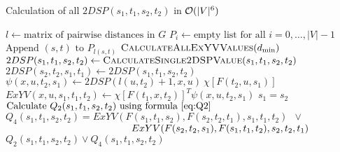 \begin{algorithm}
\caption{Calculation of all $2DSP(s_1, t_1, s_2, t_2)$ in $\mathcal{O}(|V|^6)$}
\begin{algorithmic}[1]
\State $l \gets \text{matrix of pairwise distances in }G$
\State $P_i \gets \text{empty list for all }i = 0, \ldots, |V|-1$
    \State $\text{Append }(s, t)\text{ to }P_{l(s, t)}$
\EndFor
{}
    \State $\textsc{CalculateAllExYVValues}(d_{\min})$
                \State $2DSP(s_1, t_1, s_2, t_2) \gets \textsc{CalculateSingle2DSPValue}(s_1, t_1, s_2, t_2)$
                \State $2DSP(s_2, t_2, s_1, t_1) \gets 2DSP(s_1, t_1, s_2, t_2)$ 
            \EndFor
        \EndFor
    \EndFor
\EndFor
\EndProcedure
\Statex
{}
            \State $\psi(x, u, t_2, s_1) \gets 2DSP(l(u, t_2) + 1, x, u)~\chi[F(t_2, u, s_1)]$
        \EndFor
    \EndFor
                \State $ExYV(x, u, s_1, t_1, t_2) \gets \chi[F(t_1, x, t_2)]^T \psi(x, u, t_2, s_1)$
            \EndFor
        \EndFor
    \EndFor
\EndProcedure
\Statex
{}
    \State \Return $s_1 = s_2$ 
    \State {}
\Else
    \State $\text{Calculate }Q_2(s_1, t_1, s_2, t_2)\text{ using formula \eqref{eq:Q2}}$ 
    \State $Q_4(s_1, t_1, s_2, t_2) = ExYV(F(s_1, t_1, s_2), F(s_2, t_2, t_1), s_1, t_1, t_2)\enspace\vee\enspace$ 
    \Statex $\hspace{4.5cm}ExYV(F(s_2, t_2, s_1), F(s_1, t_1, t_2), s_2, t_2, t_1)$
    \State \Return $Q_2(s_1, t_1, s_2, t_2) \vee Q_4(s_1, t_1, s_2, t_2)$
\EndIf
\EndProcedure
\end{algorithmic}
\end{algorithm}


